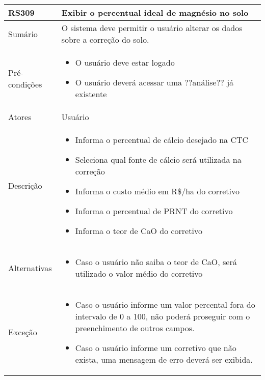 \begin{quadro}[!htb]
    \begin{tabular}{|p{3cm}|p{11cm}|}
        \hline
        \textbf{RS309} & \textbf{Exibir o percentual ideal de magnésio no solo} \\
        \hline
        Sumário        & O sistema deve permitir o usuário alterar os dados sobre a correção do solo.                  \\
        \hline
        Pré-condições  & \begin{itemize}
            \item O usuário deve estar logado
            \item O usuário deverá acessar uma ??análise?? já existente 
        \end{itemize}                 \\
        \hline
        Atores         & Usuário                  \\
        \hline
        Descrição      &
        \begin{itemize}
            \item Informa o percentual de cálcio desejado na CTC
            \item Seleciona qual fonte de cálcio será utilizada na correção
            \item Informa o custo médio em R\$/ha do corretivo
            \item Informa o percentual de PRNT do corretivo
            \item Informa o teor de CaO do corretivo
        \end{itemize}                 \\
        \hline
        Alternativas   &
        \begin{itemize}
            \item Caso o usuário não saiba o teor de CaO, será utilizado o valor médio do corretivo
        \end{itemize}                 \\
        \hline
        Exceção        &
        \begin{itemize}
            \item Caso o usuário informe um valor percental fora do intervalo de 0 a 100, não poderá proseguir com o preenchimento de outros campos.
            \item Caso o usuário informe um corretivo que não exista, uma mensagem de erro deverá ser exibida.
        \end{itemize}                   \\
        \hline
    \end{tabular}
\end{quadro}

